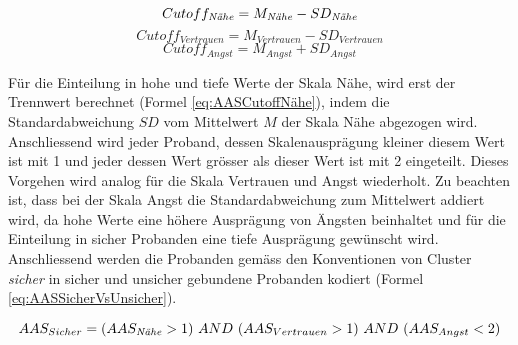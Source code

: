 \begin{equation}\label{eq:AASCutoffNähe}
    Cutoff_{\text{\textit{N{\"a}he}}}=M_{\text{\textit{N{\"a}he}}} - SD_{\text{\textit{N{\"a}he}}}
\end{equation}
\begin{equation}\label{eq:AASCutoffVertrauen}
    Cutoff_{Vertrauen}=M_{Vertrauen} - SD_{Vertrauen}
\end{equation}
\begin{equation}\label{eq:AASCutoffAngst}
    Cutoff_{Angst}=M_{Angst} + SD_{Angst}
\end{equation}

Für die Einteilung in hohe und tiefe Werte der Skala Nähe, wird erst der Trennwert berechnet (Formel \ref{eq:AASCutoffNähe}), indem die Standardabweichung $SD$ vom Mittelwert $M$ der Skala Nähe abgezogen wird. Anschliessend wird jeder Proband, dessen Skalenausprägung kleiner diesem Wert ist mit 1 und jeder dessen Wert grösser als dieser Wert ist mit 2 eingeteilt. Dieses Vorgehen wird analog für die Skala Vertrauen und Angst wiederholt. Zu beachten ist, dass bei der Skala Angst die Standardabweichung zum Mittelwert addiert wird, da hohe Werte eine höhere Ausprägung von Ängsten beinhaltet und für die Einteilung in sicher Probanden eine tiefe Ausprägung gewünscht wird. Anschliessend werden die Probanden gemäss den Konventionen von Cluster \textit{sicher} in sicher und unsicher gebundene Probanden kodiert (Formel \ref{eq:AASSicherVsUnsicher}).

\begin{equation}\label{eq:AASSicherVsUnsicher}
    AAS_{Sicher}=( AAS_{\text{\textit{N{\"a}he}}} > 1) ~AND~ (AAS_{Vertrauen} > 1) ~AND~ (AAS_{Angst} < 2)
\end{equation}

